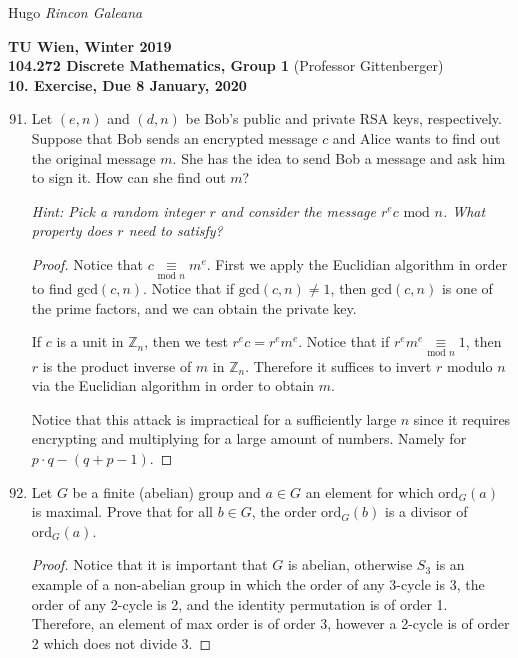 \documentclass[12pt]{article}
\newcommand{\Term}{Winter 2019}
\newcommand{\Course}{104.272 Discrete Mathematics, Group 1}
\newcommand{\Assignment}{10. Exercise}
\newcommand{\DueDate}{ 8 January, 2020 }
\begin{document}
Hugo \textit{Rincon Galeana}
\begin{center}

\textbf{TU Wien, \Term} \\
\textbf{\Course} (Professor Gittenberger) \\
\textbf{\Assignment, Due \DueDate}
\end{center}


\begin{enumerate}
    \setcounter{enumi}{90}
    \item Let $(e,n)$ and $(d,n)$ be Bob's public and private RSA keys, respectively. Suppose that Bob sends an encrypted message $c$ and Alice wants to find out the original message $m$. She has the idea to send Bob a message and ask him to sign it. How can she find out $m$?
    
    \emph{Hint: Pick a random integer $r$ and consider the message $r^e c \textrm{ mod }n$. What property does $r$ need to satisfy?}
    
    \begin{proof}
    Notice that $c \underset{\textrm{mod }n}{\equiv} m^e $.
     First we apply the Euclidian algorithm in order to find $\textrm{gcd}(c,n)$. Notice that if $\textrm{gcd}(c,n) \neq 1$, then $\textrm{gcd} (c,n)$ is one of the prime factors, and we can obtain the private key.
     
    If $c$ is a unit in $\mathbb{Z}_n$, then we test $r^e c = r^e m^e$. Notice that if $r^e m^e \underset{\textrm{mod }n}{\equiv} 1$, then $r$ is the product inverse of $m$ in $\mathbb{Z}_n$. Therefore it suffices to invert $r$ modulo $n$ via the Euclidian algorithm in order to obtain $m$.
    
    Notice that this attack is impractical for a sufficiently large $n$ since it requires encrypting and multiplying for a large amount of numbers. Namely for $p \cdot q - (q+p-1)$.
    \end{proof}
    
    \item Let $G$ be a finite (abelian) group and $a \in G$ an element for which $\textrm{ord}_G(a)$ is maximal. Prove that for all $b\in G$, the order $\textrm{ord}_G(b)$ is a divisor of $\textrm{ord}_G(a)$.
    
    \begin{proof}
    Notice that it is important that $G$ is abelian, otherwise $S_3$ is an example of a non-abelian group in which the order of any 3-cycle is 3, the order of any 2-cycle is 2, and the identity permutation is of order 1. Therefore, an element of max order is of order $3$, however a 2-cycle is of order 2 which does not divide 3.
    

\end{proof}
\end{enumerate}
\end{document}
